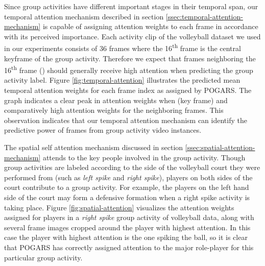 \documentclass[a4paper,fleqn]{cas-dc}
\begin{document}
Since group activities have different important stages in their temporal span, our temporal attention mechanism described in section \ref{ssec:temporal-attention-mechanism} is capable of assigning attention weights to each frame in accordance with its perceived importance.
Each activity clip of the volleyball dataset we used in our experiments consists of 36 frames where the 16\textsuperscript{th} frame is the central keyframe of the group activity.
Therefore we expect that frames neighboring the 16\textsuperscript{th} frame () should generally receive high attention when predicting the group activity label.
Figure \ref{fig:temporal-attention} illustrates the predicted mean temporal attention weights for each frame index as assigned by POGARS.
The graph indicates a clear peak in attention weights when  (key frame) and comparatively high attention weights for the neighboring frames.
This observation indicates that our temporal attention mechanism can identify the predictive power of frames from group activity video instances.

The spatial self attention mechanism discussed in section \ref{ssec:spatial-attention-mechanism} attends to the key people involved in the group activity. 
Though group activities are labeled according to the side of the volleyball court they were performed from (such as \textit{left spike} and \textit{right spike}), players on both sides of the court contribute to a group activity. 
For example, the players on the left hand side of the court may form a defensive formation when a right spike activity is taking place. 
Figure \ref{fig:spatial-attention} visualizes the attention weights assigned for players in a \textit{right spike} group activity of volleyball data, along with several frame images cropped around the player with highest attention. 
In this case the player with highest attention is the one spiking the ball, so it is clear that POGARS has correctly assigned attention to the major role-player for this particular group activity.
\end{document}
